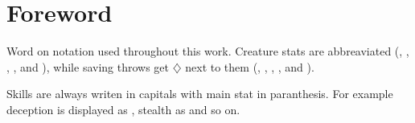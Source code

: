 \chapter*{Foreword}

Word on notation used throughout this work. Creature stats are abbreaviated (\strength, \dexterity, \constitution, \intelligence, \wisdom{} and \charisma), while saving throws get $\diamondsuit$ next to them (\strengthsave, \dexteritysave, \constitutionsave, \intelligencesave, \wisdomsave{} and \charismasave).

Skills are always writen in capitals with main stat in paranthesis. For example deception is displayed as \deception, stealth as \stealth{} and so on.